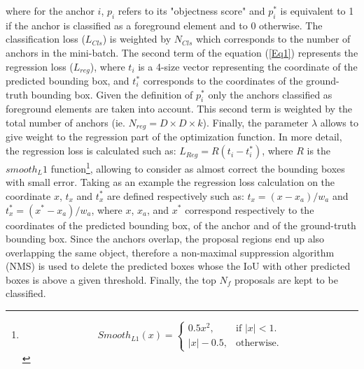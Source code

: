 \documentclass[12pt, french, a4paper]{article} %
\begin{document}
where for the anchor $i$, $p_i$ refers to its "objectness score" and $p_i^*$ is equivalent to 1 if the anchor is classified as a foreground element and to 0 otherwise. The classification loss ($L_{Cls}$) is weighted by $N_{Cls}$ which corresponds to the number of anchors in the mini-batch. The second term of the equation (\ref{Eq1}) represents the regression loss ($L_{reg}$), where $t_i$ is a 4-size vector representing the coordinate of the predicted bounding box, and $t_i^*$ corresponds to the coordinates of the ground-truth bounding box. Given the definition of $p_i^*$ only the anchors classified as foreground elements are taken into account. This second term is weighted by the total number of anchors (ie. $N_{reg} = D\times D \times k$). Finally, the parameter $\lambda$ allows to give weight to the regression part of the optimization function. In more detail, the regression loss is calculated such as: $L_{Reg} = R(t_i - t_i^*)$, where $R$ is the $smooth_L1$ function\footnote{\begin{equation}
 Smooth_{L1}(x) =\begin{cases}
 0.5x^2, & \text{if $|x|<1$}.\\
 |x| - 0.5, & \text{otherwise}.
 \end{cases}
\end{equation} }, allowing to consider as almost correct the bounding boxes with small error. Taking as an example the regression loss calculation on the coordinate $x$, $t_x$ and $t_x^*$ are defined respectively such as: $t_x = (x -x_a) / w_a$ and $t_x^* = (x^* - x_a) / w_a$, where $x$, $x_a$, and $x^*$ correspond respectively to the coordinates of the predicted bounding box, of the anchor and of the ground-truth bounding box. Since the anchors overlap, the proposal regions end up also overlapping the same object, therefore a non-maximal suppression algorithm (\gls{NMS}) \cite{neubeck2006efficient} is used to delete the predicted boxes whose the \gls{IoU} with other predicted boxes is above a given threshold. Finally, the top $N_f$ proposals are kept to be classified. 
\end{document}

